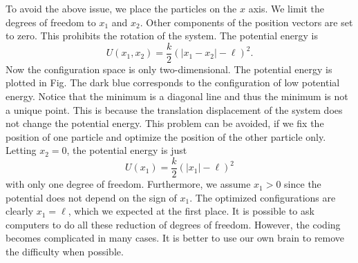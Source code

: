 To avoid the above issue, we place the particles on the $x$ axis. We limit the degrees of freedom to $x_1$ and $x_2$.  Other components of the position vectors are set to zero.  This prohibits the rotation of the system. The potential energy is 
\begin{equation}
U(x_1, x_2) = \frac{k}{2} \left (\left |x_1-x_2 \right |-\ell \right )^2.
\end{equation}
Now the configuration space is only two-dimensional.  The potential energy is plotted in Fig.  The dark blue corresponds to the configuration of low potential energy.  Notice that the minimum is a diagonal line and thus the minimum is not a unique point. This is because the translation displacement of the system does not change the potential energy.  This problem can be avoided, if we fix the position of one particle and optimize the position of the other particle only. Letting $x_2=0$, the potential energy is just
\begin{equation}
U(x_1) = \frac{k}{2} \left ( \left | x_1 \right | - \ell \right )^2
\end{equation}
with only one degree of freedom.  Furthermore, we assume $x_1>0$ since the potential does not depend on the sign of $x_1$. The optimized configurations are clearly $x_1=\ell$, which we expected at the first place.  It is possible to ask computers to do all these reduction of degrees of freedom.  However, the coding becomes complicated in many cases. It is better to use our own brain to remove the difficulty when possible. 

